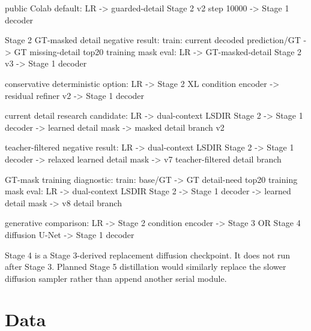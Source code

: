 \documentclass[
  10pt,
]{article}
\newenvironment{Shaded}{}{}
\newcommand{\NormalTok}[1]{#1}
\begin{document}
\begin{Shaded}
\begin{Highlighting}[]
\NormalTok{public Colab default:}
\NormalTok{  LR {-}\textgreater{} guarded{-}detail Stage 2 v2 step 10000 {-}\textgreater{} Stage 1 decoder}

\NormalTok{Stage 2 GT{-}masked detail negative result:}
\NormalTok{  train: current decoded prediction/GT {-}\textgreater{} GT missing{-}detail top20 training mask}
\NormalTok{  eval:  LR {-}\textgreater{} GT{-}masked{-}detail Stage 2 v3 {-}\textgreater{} Stage 1 decoder}

\NormalTok{conservative deterministic option:}
\NormalTok{  LR {-}\textgreater{} Stage 2 XL condition encoder {-}\textgreater{} residual refiner v2 {-}\textgreater{} Stage 1 decoder}

\NormalTok{current detail research candidate:}
\NormalTok{  LR {-}\textgreater{} dual{-}context LSDIR Stage 2 {-}\textgreater{} Stage 1 decoder}
\NormalTok{     {-}\textgreater{} learned detail mask {-}\textgreater{} masked detail branch v2}

\NormalTok{teacher{-}filtered negative result:}
\NormalTok{  LR {-}\textgreater{} dual{-}context LSDIR Stage 2 {-}\textgreater{} Stage 1 decoder}
\NormalTok{     {-}\textgreater{} relaxed learned detail mask {-}\textgreater{} v7 teacher{-}filtered detail branch}

\NormalTok{GT{-}mask training diagnostic:}
\NormalTok{  train: base/GT {-}\textgreater{} GT detail{-}need top20 training mask}
\NormalTok{  eval:  LR {-}\textgreater{} dual{-}context LSDIR Stage 2 {-}\textgreater{} Stage 1 decoder}
\NormalTok{            {-}\textgreater{} learned detail mask {-}\textgreater{} v8 detail branch}

\NormalTok{generative comparison:}
\NormalTok{  LR {-}\textgreater{} Stage 2 condition encoder {-}\textgreater{} Stage 3 OR Stage 4 diffusion U{-}Net}
\NormalTok{     {-}\textgreater{} Stage 1 decoder}
\end{Highlighting}
\end{Shaded}

Stage 4 is a Stage 3-derived replacement diffusion checkpoint. It does
not run after Stage 3. Planned Stage 5 distillation would similarly
replace the slower diffusion sampler rather than append another serial
module.

\hypertarget{data}{%
\section{Data}\label{data}}
\end{document}
